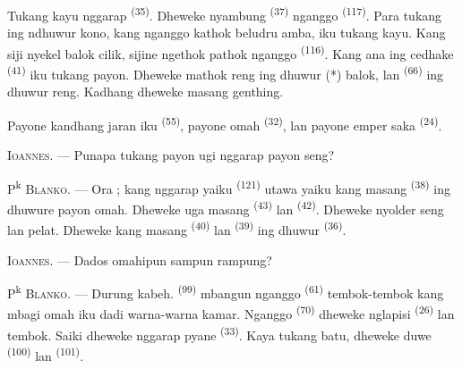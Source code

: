 Tukang kayu nggarap  \textsuperscript{(35)}.
Dheweke nyambung  \textsuperscript{(37)} nganggo
 \textsuperscript{(117)}. Para tukang ing ndhuwur kono,
kang nganggo kathok beludru amba, iku tukang kayu. Kang siji nyekel
balok cilik, sijine ngethok pathok nganggo 
\textsuperscript{(116)}. Kang ana ing cedhake 
\textsuperscript{(41)} iku tukang payon. Dheweke mathok reng ing dhuwur
(*) balok, lan  \textsuperscript{(66)} ing dhuwur
reng. Kadhang dheweke masang genthing.


Payone kandhang jaran iku  \textsuperscript{(55)},
payone omah  \textsuperscript{(32)}, lan payone
emper saka  \textsuperscript{(24)}.

\textsc{Ioannes}. --- Punapa tukang payon ugi nggarap payon seng?

P\textsuperscript{k} \textsc{Blanko}. --- Ora ; kang nggarap yaiku
 \textsuperscript{(121)} utawa  yaiku kang masang 
\textsuperscript{(38)} ing dhuwure payon omah. Dheweke uga masang
 \textsuperscript{(43)} lan 
\textsuperscript{(42)}. Dheweke nyolder seng lan pelat. Dheweke kang
masang  \textsuperscript{(40)} lan
 \textsuperscript{(39)} ing dhuwur
 \textsuperscript{(36)}.

\textsc{Ioannes}. --- Dados omahipun sampun rampung?

\VUsaut{3.0mm}
\VUsaut{3.0mm}

P\textsuperscript{k} \textsc{Blanko}. --- Durung kabeh.  \textsuperscript{(99)} mbangun nganggo 
\textsuperscript{(61)} tembok-tembok kang mbagi omah iku dadi
warna-warna kamar. Nganggo  \textsuperscript{(70)}
dheweke nglapisi  \textsuperscript{(26)} lan tembok. Saiki
dheweke nggarap pyane  \textsuperscript{(33)}. Kaya tukang
batu, dheweke duwe  \textsuperscript{(100)} lan  \textsuperscript{(101)}.


